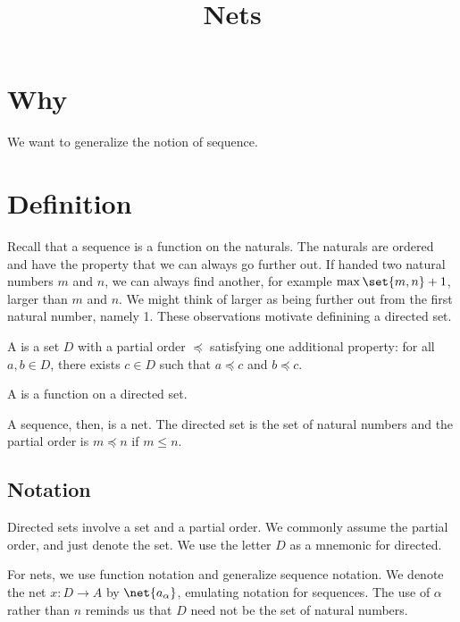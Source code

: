 






\title{Nets}

\section{Why}
We want to generalize the notion of sequence.


\section{Definition}

Recall that a sequence is a function on the naturals.
The naturals are ordered and have the property that we can always go further out.
If handed two natural numbers $m$ and $n$, we can always find another, for example $\max\set{m,n}+1$, larger than $m$ and $n$.
We might think of larger as being further out from the first natural number, namely 1.
These observations motivate definining a directed set.

\begin{defn}
A  is a set $D$ with a partial order $\preceq$ satisfying one additional property: for all $a, b \in D$, there exists $c \in D$ such that $a \preceq c$ and $b \preceq c$.
\end{defn}

\begin{defn}
A  is a function on a directed set.
\end{defn}

A sequence, then, is a net.
The directed set is the set of natural numbers and the partial order is $m \preceq n$ if $m \leq n$.

\subsection{Notation}
Directed sets involve a set and a partial order.
We commonly assume the partial order, and just denote the set.
We use the letter $D$ as a mnemonic for directed.

For nets, we use function notation and generalize sequence notation.
We denote the net $x: D \to A$ by $\net{a_{\alpha}}$, emulating notation for sequences.
The use of $\alpha$ rather than $n$ reminds us that $D$ need not be the set of natural numbers.


